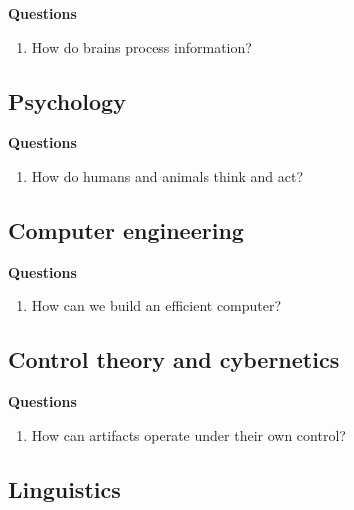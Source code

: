 \textbf{Questions}
\begin{enumerate}[itemsep=0.1cm]
    \item How do brains process information?
    \hfill \cite{ai/book/Artificial-Intelligence-A-Modern-Approach/Russell-Norvig}

\end{enumerate}



\subsection{Psychology}

\textbf{Questions}
\begin{enumerate}[itemsep=0.1cm]
    \item How do humans and animals think and act?
    \hfill \cite{ai/book/Artificial-Intelligence-A-Modern-Approach/Russell-Norvig}

\end{enumerate}




\subsection{Computer engineering}

\textbf{Questions}
\begin{enumerate}[itemsep=0.1cm]
    \item How can we build an efficient computer?
    \hfill \cite{ai/book/Artificial-Intelligence-A-Modern-Approach/Russell-Norvig}

\end{enumerate}




\subsection{Control theory and cybernetics}

\textbf{Questions}
\begin{enumerate}[itemsep=0.1cm]
    \item How can artifacts operate under their own control?
    \hfill \cite{ai/book/Artificial-Intelligence-A-Modern-Approach/Russell-Norvig}

\end{enumerate}




\subsection{Linguistics}


